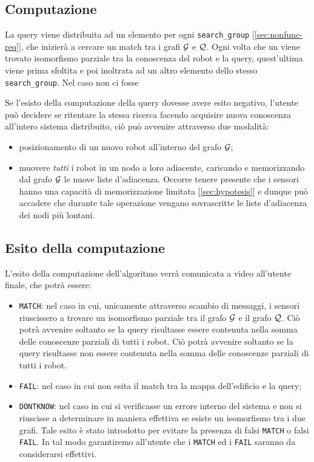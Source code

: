 \documentclass{llncs}
\begin{document}
\subsection{Computazione}
\label{sec:computation}
La query viene distribuita ad un elemento per ogni \texttt{search\_group} [\ref*{sec:nonfunc-req}],
che inizierà a cercare un match tra i grafi $\mathcal{G}$ e $\mathcal{Q}$. Ogni volta che un viene trovato isomorfismo
parziale tra la conoscenza del robot e la query, quest'ultima viene prima sfoltita e poi inoltrata ad
un altro elemento dello stesso \texttt{search\_group}. Nel caso non ci fosse 

Se l'esisto della computazione della query dovesse avere esito negativo,
l'utente può decidere se ritentare la stessa ricerca facendo acquisire nuova conoscenza
all'intero sistema distribuito, ciò può avvenire attraverso due modalità:
\begin{itemize}
	\item posizionamento di un nuovo robot all'interno del grafo $\mathcal{G}$;
	\item muovere \emph{tutti} i robot in un nodo a loro adiacente, caricando e memorizzando
	dal grafo $\mathcal{G}$ le nuove liste d'adiacenza. Occorre tenere presente che i sensori hanno
	una capacità di memorizzazione limitata [\ref{sec:hypotesis}] e dunque può accadere che durante
	tale operazione vengano sovrascritte  le liste d'adiacenza dei nodi più lontani.
\end{itemize}

\subsection{Esito della computazione}
L'esito della computazione dell'algoritmo verrà comunicata a video all'utente finale, che potrà essere:
\begin{itemize}
\item \texttt{MATCH}: nel caso in cui, unicamente attraverso scambio di messaggi,
i sensori riuscissero a trovare un isomorfismo parziale tra il grafo $\mathcal{G}$ e il grafo $\mathcal{Q}$.
Ciò potrà avvenire soltanto se la query risultasse essere contenuta nella somma delle conoscenze
parziali di tutti i robot.
Ciò potrà avvenire soltanto se la query risultasse non essere contenuta nella somma delle conoscenze
parziali di tutti i robot.
\item \texttt{FAIL}: nel caso in cui non esita il match tra la mappa dell'edificio e la query;
\item \texttt{DONTKNOW}: nel caso in cui si verificasse un errore interno del sistema e
non si riuscisse a determinare in maniera effettiva se esiste un isomorfismo tra i due grafi. Tale esito
è stato introdotto per evitare la presenza di falsi \texttt{MATCH} o falsi \texttt{FAIL}. In tal modo garantiremo all'utente che i  \texttt{MATCH} ed i  \texttt{FAIL} saranno da considerarsi effettivi.
\end{itemize}
\end{document}
